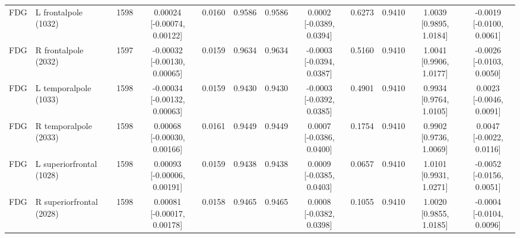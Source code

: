\documentclass{article}
\begin{document}
\begin{landscape}
\begin{table}[p]
{\begin{tabular}{llrccccccccc}
FDG & L frontalpole (1032) & 1598 & \shortstack{0.00024\\{}[-0.00074, 0.00122]} & 0.0160 & 0.9586 & 0.9586 & \shortstack{0.0002\\{}[-0.0389, 0.0394]} & 0.6273 & 0.9410 & \shortstack{1.0039\\{}[0.9895, 1.0184]} & \shortstack{-0.0019\\{}[-0.0100, 0.0061]} \\
FDG & R frontalpole (2032) & 1597 & \shortstack{-0.00032\\{}[-0.00130, 0.00065]} & 0.0159 & 0.9634 & 0.9634 & \shortstack{-0.0003\\{}[-0.0394, 0.0387]} & 0.5160 & 0.9410 & \shortstack{1.0041\\{}[0.9906, 1.0177]} & \shortstack{-0.0026\\{}[-0.0103, 0.0050]} \\
FDG & L temporalpole (1033) & 1598 & \shortstack{-0.00034\\{}[-0.00132, 0.00063]} & 0.0159 & 0.9430 & 0.9430 & \shortstack{-0.0003\\{}[-0.0392, 0.0385]} & 0.4901 & 0.9410 & \shortstack{0.9934\\{}[0.9764, 1.0105]} & \shortstack{0.0023\\{}[-0.0046, 0.0091]} \\
FDG & R temporalpole (2033) & 1598 & \shortstack{0.00068\\{}[-0.00030, 0.00166]} & 0.0161 & 0.9449 & 0.9449 & \shortstack{0.0007\\{}[-0.0386, 0.0400]} & 0.1754 & 0.9410 & \shortstack{0.9902\\{}[0.9736, 1.0069]} & \shortstack{0.0047\\{}[-0.0022, 0.0116]} \\
FDG & L superiorfrontal (1028) & 1598 & \shortstack{0.00093\\{}[-0.00006, 0.00191]} & 0.0159 & 0.9438 & 0.9438 & \shortstack{0.0009\\{}[-0.0385, 0.0403]} & 0.0657 & 0.9410 & \shortstack{1.0101\\{}[0.9931, 1.0271]} & \shortstack{-0.0052\\{}[-0.0156, 0.0051]} \\
FDG & R superiorfrontal (2028) & 1598 & \shortstack{0.00081\\{}[-0.00017, 0.00178]} & 0.0158 & 0.9465 & 0.9465 & \shortstack{0.0008\\{}[-0.0382, 0.0398]} & 0.1055 & 0.9410 & \shortstack{1.0020\\{}[0.9855, 1.0185]} & \shortstack{-0.0004\\{}[-0.0104, 0.0096]} \\

\end{tabular}}
\end{table}
\end{landscape}
\end{document}
